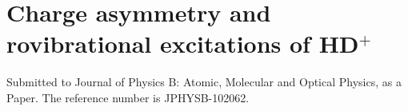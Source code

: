 \chapter{Charge asymmetry and rovibrational excitations of HD$^+$\label{apndx8}}

Submitted to Journal of Physics B: Atomic, Molecular and Optical Physics, as a Paper. 
The reference number is JPHYSB-102062.



